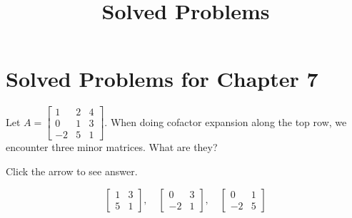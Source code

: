 \documentclass{ximera}
\title{Solved Problems} \license{CC BY-NC-SA 4.0}
\begin{document}
\begin{abstract}
\end{abstract}
\maketitle

\section*{Solved Problems for Chapter 7}

\begin{problem}\label{prb:7.2} Let $A = \left[ \begin{array}{rrr}
1 & 2 & 4 \\
0 & 1 & 3 \\
-2 & 5 & 1
\end{array} \right]$. When doing cofactor expansion along the top row, we encounter three minor matrices.  What are they?

Click the arrow to see answer.
\begin{expandable}
$$\begin{bmatrix}1&3\\5&1\end{bmatrix},\quad\begin{bmatrix}0&3\\-2&1\end{bmatrix},\quad\begin{bmatrix}0&1\\-2&5\end{bmatrix}$$
\end{expandable}
\end{problem}
\end{document}
